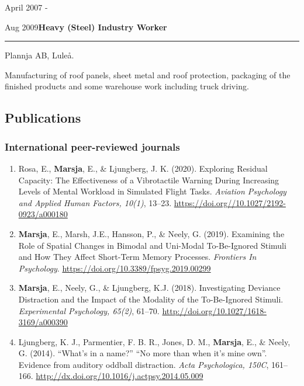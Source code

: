 \documentclass[]{article}
\begin{document}
April 2007 -

Aug
2009\hspace{0.75cm}\textbf{Heavy (Steel) Industry Worker}\vspace{1mm}

\hrule
\begin{changemargin}{2.3cm}{2.4cm}

Plannja AB, Luleå.

Manufacturing of roof panels, sheet metal and roof protection, packaging of the
finished products and some warehouse work including truck driving. 

\end{changemargin}

\hypertarget{publications}{%
\subsection{Publications}\label{publications}}

\hypertarget{international-peer-reviewed-journals}{%
\subsubsection{International peer-reviewed
journals}\label{international-peer-reviewed-journals}}

\begin{enumerate}
\def\labelenumi{\arabic{enumi}.}
\item
  Rosa, E., \textbf{Marsja}, E., \& Ljungberg, J. K. (2020). Exploring
  Residual Capacity: The Effectiveness of a Vibrotactile Warning During
  Increasing Levels of Mental Workload in Simulated Flight Tasks.
  \emph{Aviation Psychology and Applied Human Factors, 10(1)}, 13--23.
  \url{https://doi.org//10.1027/2192-0923/a000180}
\item
  \textbf{Marsja}, E., Marsh, J.E., Hansson, P., \& Neely, G. (2019).
  Examining the Role of Spatial Changes in Bimodal and Uni-Modal
  To-Be-Ignored Stimuli and How They Affect Short-Term Memory Processes.
  \emph{Frontiers In Psychology}.
  \url{https://doi.org/10.3389/fpsyg.2019.00299}
\item
  \textbf{Marsja}, E., Neely, G., \& Ljungberg, K.J. (2018).
  Investigating Deviance Distraction and the Impact of the Modality of
  the To-Be-Ignored Stimuli. \emph{Experimental Psychology, 65(2)},
  61--70. \url{http://doi.org/10.1027/1618-3169/a000390}
\item
  Ljungberg, K. J., Parmentier, F. B. R., Jones, D. M., \textbf{Marsja},
  E., \& Neely, G. (2014). ``What's in a name?'' ``No more than when
  it's mine own''. Evidence from auditory oddball distraction.
  \emph{Acta Psychologica, 150C}, 161--166.
  \url{http://dx.doi.org/10.1016/j.actpsy.2014.05.009}
\end{enumerate}
\end{document}
